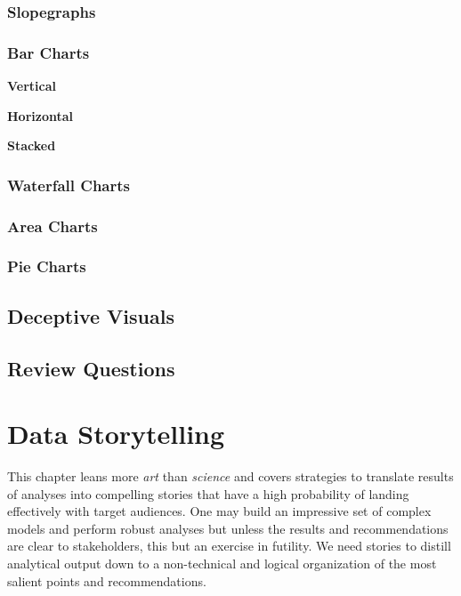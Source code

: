 \documentclass[
]{book}
\begin{document}
\hypertarget{slopegraphs}{%
\subsection{Slopegraphs}\label{slopegraphs}}

\hypertarget{bar-charts}{%
\subsection{Bar Charts}\label{bar-charts}}

\textbf{Vertical}

\textbf{Horizontal}

\textbf{Stacked}

\hypertarget{waterfall-charts}{%
\subsection{Waterfall Charts}\label{waterfall-charts}}

\hypertarget{area-charts}{%
\subsection{Area Charts}\label{area-charts}}

\hypertarget{pie-charts}{%
\subsection{Pie Charts}\label{pie-charts}}

\hypertarget{deceptive-visuals}{%
\section{Deceptive Visuals}\label{deceptive-visuals}}

\hypertarget{review-questions-12}{%
\section{Review Questions}\label{review-questions-12}}

\hypertarget{storytelling}{%
\chapter{Data Storytelling}\label{storytelling}}

This chapter leans more \emph{art} than \emph{science} and covers strategies to translate results of analyses into compelling stories that have a high probability of landing effectively with target audiences. One may build an impressive set of complex models and perform robust analyses but unless the results and recommendations are clear to stakeholders, this but an exercise in futility. We need stories to distill analytical output down to a non-technical and logical organization of the most salient points and recommendations.
\end{document}
